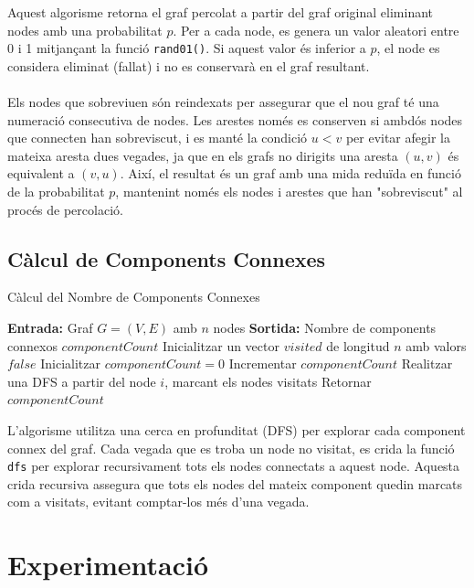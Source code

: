 \documentclass[a4paper]{article}
\begin{document}
	Aquest algorisme retorna el graf percolat a partir del graf original eliminant nodes amb una probabilitat $p$. Per a cada node, es genera un valor aleatori entre 0 i 1 mitjançant la funció \texttt{rand01()}. Si aquest valor és inferior a $p$, el node es considera eliminat (fallat) i no es conservarà en el graf resultant. \\ \\
	Els nodes que sobreviuen són reindexats per assegurar que el nou graf té una numeració consecutiva de nodes. Les arestes només es conserven si ambdós nodes que connecten han sobreviscut, i es manté la condició $u<v$ per evitar afegir la mateixa aresta dues vegades, ja que en els grafs no dirigits una aresta $(u,v)$ és equivalent a $(v,u)$. Així, el resultat és un graf amb una mida reduïda en funció de la probabilitat $p$, mantenint només els nodes i arestes que han "sobreviscut" al procés de percolació.
	
	\subsection{Càlcul de Components Connexes}
	\begin{algorithm} [H]
		\caption{Càlcul del Nombre de Components Connexes}
		\begin{algorithmic} [1]
			\Statex \textbf{Entrada:} Graf $G = (V, E)$ amb $n$ nodes
			\Statex \textbf{Sortida:} Nombre de components connexos $componentCount$
			\Statex \vspace{-0.25em}
			\State Inicialitzar un vector $visited$ de longitud $n$ amb valors $false$
			\State Inicialitzar $componentCount = 0$
					\State Incrementar $componentCount$
					\State Realitzar una DFS a partir del node $i$, marcant els nodes visitats
				\EndIf
			\EndFor
			\State Retornar $componentCount$
		\end{algorithmic}
	\end{algorithm}
	
	L'algorisme utilitza una cerca en profunditat (DFS) per explorar cada component connex del graf. Cada vegada que es troba un node no visitat, es crida la funció \texttt{dfs} per explorar recursivament tots els nodes connectats a aquest node. Aquesta crida recursiva assegura que tots els nodes del mateix component quedin marcats com a visitats, evitant comptar-los més d'una vegada. 

	\newpage
	\section{Experimentació}
	
\end{document}
